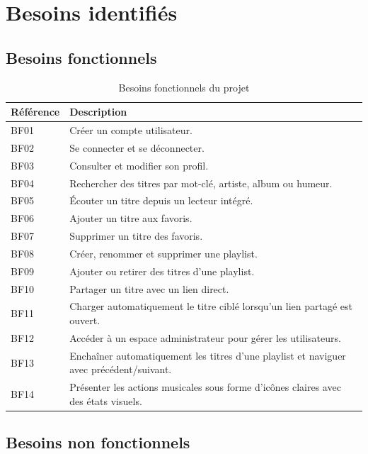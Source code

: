 \documentclass[12pt,a4paper]{report}
\newcommand{\tableHeader}{\rowcolor{primary!12}}
\begin{document}
\section{Besoins identifiés}

\subsection{Besoins fonctionnels}

\begin{longtable}{|p{2.4cm}|p{11.2cm}|}
\caption{Besoins fonctionnels du projet} \\
\hline
\tableHeader \textbf{Référence} & \textbf{Description} \\
\hline
BF01 & Créer un compte utilisateur. \\
\hline
BF02 & Se connecter et se déconnecter. \\
\hline
BF03 & Consulter et modifier son profil. \\
\hline
BF04 & Rechercher des titres par mot-clé, artiste, album ou humeur. \\
\hline
BF05 & Écouter un titre depuis un lecteur intégré. \\
\hline
BF06 & Ajouter un titre aux favoris. \\
\hline
BF07 & Supprimer un titre des favoris. \\
\hline
BF08 & Créer, renommer et supprimer une playlist. \\
\hline
BF09 & Ajouter ou retirer des titres d'une playlist. \\
\hline
BF10 & Partager un titre avec un lien direct. \\
\hline
BF11 & Charger automatiquement le titre ciblé lorsqu'un lien partagé est ouvert. \\
\hline
BF12 & Accéder à un espace administrateur pour gérer les utilisateurs. \\
\hline
BF13 & Enchaîner automatiquement les titres d'une playlist et naviguer avec précédent/suivant. \\
\hline
BF14 & Présenter les actions musicales sous forme d'icônes claires avec des états visuels. \\
\hline
\end{longtable}

\subsection{Besoins non fonctionnels}
\end{document}
